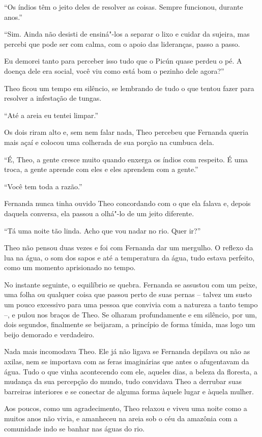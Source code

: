 ``Os índios têm o jeito deles de resolver as coisas. Sempre funcionou,
durante anos.''

``Sim. Ainda não desisti de ensiná"-los a separar o lixo e cuidar da
sujeira, mas percebi que pode ser com calma, com o apoio das lideranças,
passo a passo.

Eu demorei tanto para perceber isso tudo que o Picún quase perdeu o pé.
A doença dele era social, você viu como está bom o pezinho dele agora?''

Theo ficou um tempo em silêncio, se lembrando de tudo o que tentou fazer
para resolver a infestação de tungas.

``Até a areia eu tentei limpar.''

Os dois riram alto e, sem nem falar nada, Theo percebeu que Fernanda
queria mais açaí e colocou uma colherada de sua porção na cumbuca dela.

``É, Theo, a gente cresce muito quando enxerga os índios com respeito. É
uma troca, a gente aprende com eles e eles aprendem com a gente.''

``Você tem toda a razão.''

Fernanda nunca tinha ouvido Theo concordando com o que ela falava e,
depois daquela conversa, ela passou a olhá"-lo de um jeito diferente.

``Tá uma noite tão linda. Acho que vou nadar no rio. Quer ir?''

Theo não pensou duas vezes e foi com Fernanda dar um mergulho. O
reflexo da lua na água, o som dos sapos e até a temperatura da água,
tudo estava perfeito, como um momento aprisionado no tempo.

No instante seguinte, o equilíbrio se quebra. Fernanda se assustou com
um peixe, uma folha ou qualquer coisa que passou perto de suas pernas --
talvez um susto um pouco excessivo para uma pessoa que convivia com a
natureza a tanto tempo --, e pulou nos braços de Theo. Se olharam
profundamente e em silêncio, por um, dois segundos, finalmente se
beijaram, a princípio de forma tímida, mas logo um beijo demorado e
verdadeiro.

Nada mais incomodava Theo. Ele já não ligava se Fernanda depilava ou não
as axilas, nem se importava com as feras imaginárias que antes o
afugentavam da água. Tudo o que vinha acontecendo com ele, aqueles dias,
a beleza da floresta, a mudança da sua percepção do mundo, tudo
convidava Theo a derrubar suas barreiras interiores e se conectar de
alguma forma àquele lugar e àquela mulher.

Aos poucos, como um agradecimento, Theo relaxou e viveu uma noite como a
muitos anos não vivia, e amanheceu na areia sob o céu da amazônia com a
comunidade indo se banhar nas águas do rio.

